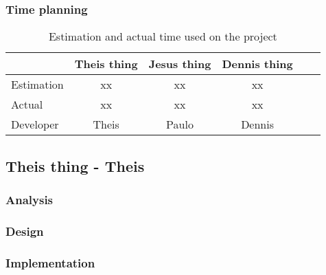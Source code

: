 \subsubsection{Time planning}

\begin{table}[H]
\centering
	\begin{tabular}{|l|c|c|c|c|c|}
		\hline
		~			& Theis thing			& Jesus thing		& Dennis thing	\\ \hline
		Estimation	& xx					& xx				& xx			\\
		Actual		& xx					& xx				& xx			\\
		Developer	& Theis					& Paulo				& Dennis		\\
		\hline
	\end{tabular}
	\caption{Estimation and actual time used on the project}
\end{table}
\subsection{Theis thing - Theis}
%
\subsubsection{Analysis}
%
%
\subsubsection{Design}
%
%
\subsubsection{Implementation}
%
%
